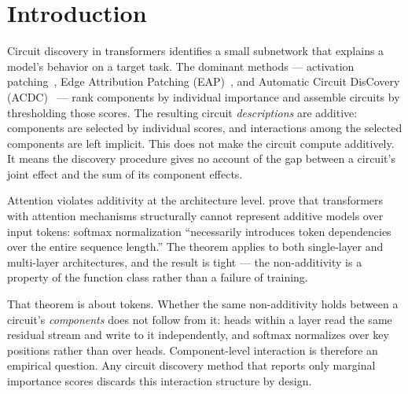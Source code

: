 \documentclass{article}
\begin{document}


%
%

\section{Introduction}
\label{sec:introduction}

Circuit discovery in transformers identifies a small subnetwork that
explains a model's behavior on a target task. The dominant methods ---
activation patching~\citep{wang2022ioi}, Edge Attribution Patching
(EAP)~\citep{syed2023attribution}, and Automatic Circuit DisCovery
(ACDC)~\citep{conmy2023acdc} --- rank components by individual
importance and assemble circuits by thresholding those scores. The
resulting circuit \emph{descriptions} are additive: components are selected by individual scores, and interactions among the selected components are left implicit. This does not make the circuit compute additively. It means the discovery procedure gives no account of the gap between a circuit's joint effect and the sum of its component effects.

Attention violates additivity at the architecture level.
\citet{leemann2024slalom} prove that transformers with attention
mechanisms structurally cannot represent additive models over input
tokens: softmax normalization ``necessarily introduces token
dependencies over the entire sequence length.'' The theorem applies to
both single-layer and multi-layer architectures, and the result is
tight --- the non-additivity is a property of the function class rather
than a failure of training.

That theorem is about tokens. Whether the same non-additivity holds
between a circuit's \emph{components} does not follow from it: heads
within a layer read the same residual stream and write to it
independently, and softmax normalizes over key positions rather than
over heads. Component-level interaction is therefore an empirical
question. Any circuit discovery method that
reports only marginal importance scores discards this interaction
structure by design.
\end{document}
